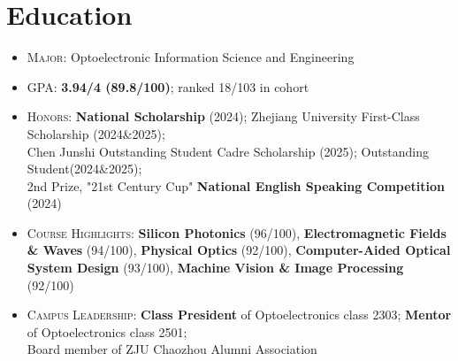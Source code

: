 \documentclass{resume}
\begin{document}
\small



\section{Education}

\begin{itemize} [parsep=0.5ex]
  \item \textsc{Major}: Optoelectronic Information Science and Engineering
  \item \textsc{GPA}: \textbf{3.94/4 (89.8/100)}; ranked 18/103 in cohort
  \item \textsc{Honors}: \textbf{National Scholarship} (2024); Zhejiang University First-Class Scholarship (2024\&2025);\\ Chen Junshi Outstanding Student Cadre Scholarship (2025); Outstanding Student(2024\&2025);\\ 2nd Prize, "21st Century Cup" \textbf{National English Speaking Competition} (2024)
  \item \textsc{Course Highlights}: \textbf{Silicon Photonics} (96/100), \textbf{Electromagnetic Fields \& Waves} (94/100), \textbf{Physical Optics} (92/100), \textbf{Computer-Aided Optical System Design} (93/100), \textbf{Machine Vision \& Image Processing} (92/100)
  \item \textsc{Campus Leadership}: \textbf{Class President} of Optoelectronics class 2303; \textbf{Mentor} of Optoelectronics class 2501; \\ Board member of ZJU Chaozhou Alumni Association
\end{itemize}
\end{document}

